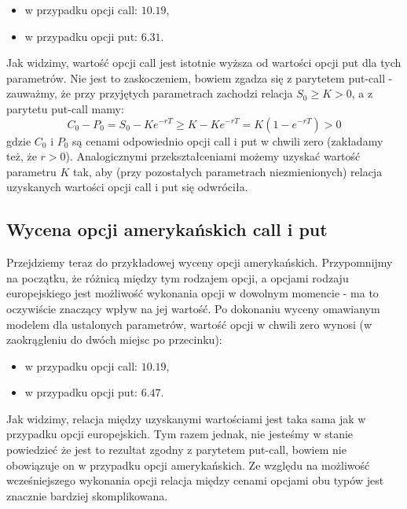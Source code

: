 \documentclass[
]{article}
\begin{document}
\begin{itemize}
\item
  w przypadku opcji call: \(10.19\),
\item
  w przypadku opcji put: \(6.31\).
\end{itemize}

Jak widzimy, wartość opcji call jest istotnie wyższa od wartości opcji
put dla tych parametrów. Nie jest to zaskoczeniem, bowiem zgadza się z
parytetem put-call - zauważmy, że przy przyjętych parametrach zachodzi
relacja \(S_0 \ge K > 0\), a z parytetu put-call mamy: \[
C_0 - P_0 = S_0 - Ke^{-rT} \ge K - Ke^{-rT} = K(1 - e^{-rT}) > 0
\] gdzie \(C_0\) i \(P_0\) są cenami odpowiednio opcji call i put w
chwili zero (zakładamy też, że \(r > 0\)). Analogicznymi
przekształceniami możemy uzyskać wartość parametru \(K\) tak, aby (przy
pozostałych parametrach niezmienionych) relacja uzyskanych wartości
opcji call i put się odwróciła.

\hypertarget{wycena-opcji-amerykaux144skich-call-i-put}{%
\subsection{Wycena opcji amerykańskich call i
put}\label{wycena-opcji-amerykaux144skich-call-i-put}}

Przejdziemy teraz do przykładowej wyceny opcji amerykańskich.
Przypomnijmy na początku, że różnicą między tym rodzajem opcji, a
opcjami rodzaju europejskiego jest możliwość wykonania opcji w dowolnym
momencie - ma to oczywiście znaczący wpływ na jej wartość. Po dokonaniu
wyceny omawianym modelem dla ustalonych parametrów, wartość opcji w
chwili zero wynosi (w zaokrągleniu do dwóch miejsc po przecinku):

\begin{itemize}
\item
  w przypadku opcji call: \(10.19\),
\item
  w przypadku opcji put: \(6.47\).
\end{itemize}

Jak widzimy, relacja między uzyskanymi wartościami jest taka sama jak w
przypadku opcji europejskich. Tym razem jednak, nie jesteśmy w stanie
powiedzieć że jest to rezultat zgodny z parytetem put-call, bowiem nie
obowiązuje on w przypadku opcji amerykańskich. Ze względu na możliwość
wcześniejszego wykonania opcji relacja między cenami opcjami obu typów
jest znacznie bardziej skomplikowana.
\end{document}
